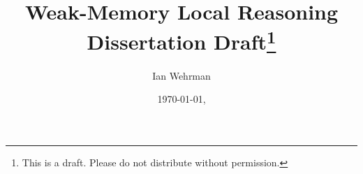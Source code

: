 \documentclass[11pt]{article}
\begin{document}
 

	\author{Ian Wehrman} 
	\title{Weak-Memory Local Reasoning\\Dissertation Draft\footnote{This is a draft. Please do not distribute without permission.}} 
	\date{\today, \currenttime}
	\maketitle





\end{document}
